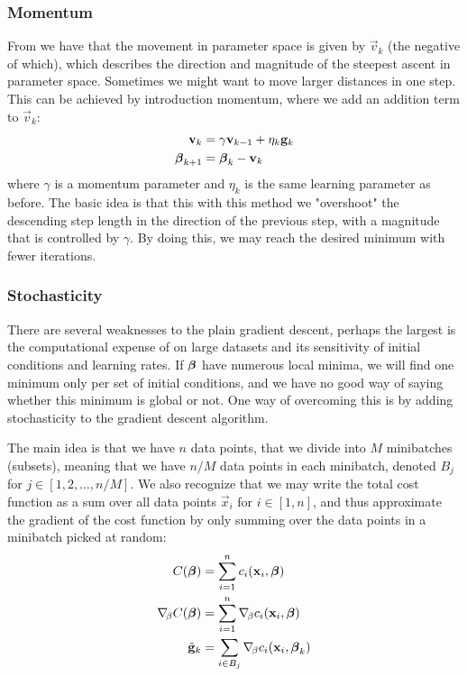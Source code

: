     \subsubsection{Momentum}\label{sec:momentum}
        From  we have that the movement in parameter space is given by $\vec{v}_k$ (the negative of which), which describes the direction and magnitude of the steepest ascent in parameter space. Sometimes we might want to move larger distances in one step. This can be achieved by introduction momentum, where we add an addition term to $\vec{v}_k$:
        \begin{align}
            \mathbf{v}_k &= \gamma\mathbf{v}_{k-1} + \eta_k\mathbf{g}_k \nonumber \\
            \boldsymbol{\beta}_{k+1} &= \boldsymbol{\beta}_k - \mathbf{v}_k
        \end{align}
        where $\gamma$ is a momentum parameter and $\eta_k$ is the same learning parameter as before. The basic idea is that this with this method we "overshoot" the descending step length in the direction of the previous step, with a magnitude that is controlled by $\gamma$. By doing this, we may reach the desired minimum with fewer iterations. 

    \subsubsection{Stochasticity}\label{sec:stochasticity}
        There are several weaknesses to the plain gradient descent, perhaps the largest is the computational expense of on large datasets and its sensitivity of initial conditions and learning rates. If $\boldsymbol{\beta}$ have numerous local minima, we will find one minimum only per set of initial conditions, and we have no good way of saying whether this minimum is global or not. One way of overcoming this is by adding stochasticity to the gradient descent algorithm. 

        The main idea is that we have $n$ data points, that we divide into $M$ minibatches (subsets), meaning that we have $n/M$ data points in each minibatch, denoted $B_j$ for $j\in[1,2,\dots,n/M]$. We also recognize that we may write the total cost function as a sum over all data points $\vec{x}_i$ for $i\in[1,n]$, and thus approximate the gradient of the cost function by only summing over the data points in a minibatch picked at random:
        \begin{align}
            C(\boldsymbol{\beta}) &= \sum_{i=1}^nc_i(\mathbf{x}_i, \boldsymbol{\beta}) \nonumber \\
            \nabla_{\!\beta} C(\boldsymbol{\beta}) &= \sum_{i=1}^n \nabla_{\!\beta}c_i(\mathbf{x}_i,\boldsymbol{\beta}) \nonumber \\
            \tilde{\mathbf{g}}_k &= \sum_{i\in B_j}\nabla_{\!\beta} c_i(\mathbf{x}_i, \boldsymbol{\beta}_k)
        \end{align}
